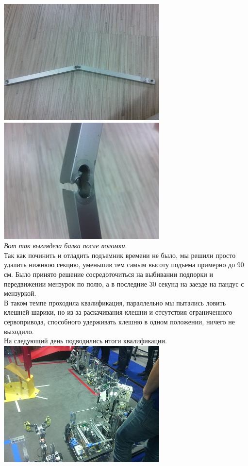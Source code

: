 	\includegraphics{Days/21-24.11.14/11_1_robot.png}
	\includegraphics{Days/21-24.11.14/11_2_robot.png}\\
\emph{Вот так выглядела балка после поломки}.\\
Так как починить и отладить подъемник времени не было, мы решили просто удалить нижнюю секцию, уменьшив тем самым высоту подъема примерно до 90 см. Было принято решение сосредоточиться на выбивании подпорки и передвижении мензурок по полю, а в последние 30 секунд на заезде на пандус с мензуркой.\\
В таком темпе проходила квалификация, параллельно мы пытались ловить клешней шарики, но из-за раскачивания клешни и отсутствия ограниченного сервопривода, способного удерживать клешню в одном положении, ничего не выходило.\\
На следующий день подводились итоги квалификации.\\
	\includegraphics{Days/21-24.11.14/11_3_robot.png}
